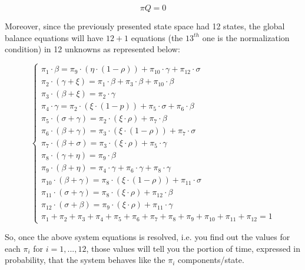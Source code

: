 \documentclass{article}
\begin{document}
\[\pi Q = 0\]

\noindent Moreover, since the previously presented state space had 12 states, the global balance equations will have \(12 + 1\) equations (the \(13^{th}\) one is the normalization condition) in 12 unknowns as represented below:

\begin{equation*}
  \begin{cases}
    \pi_{1} \cdot \beta = \pi_{9} \cdot (\eta \cdot (1 - \rho)) + \pi_{10} \cdot \gamma + \pi_{12} \cdot \sigma \\
    \pi_{2} \cdot (\gamma + \xi) = \pi_{1} \cdot \beta + \pi_{3} \cdot \beta + \pi_{10} \cdot \beta \\
    \pi_{3} \cdot (\beta + \xi) = \pi_{2} \cdot \gamma \\
    \pi_{4} \cdot \gamma = \pi_{2} \cdot (\xi \cdot (1 - p)) + \pi_{5} \cdot \sigma + \pi_{6} \cdot \beta \\
    \pi_{5} \cdot (\sigma + \gamma) = \pi_{2} \cdot (\xi \cdot \rho) + \pi_{7} \cdot \beta \\
    \pi_{6} \cdot (\beta + \gamma) = \pi_{3} \cdot (\xi \cdot (1 - \rho)) +\pi_{7} \cdot \sigma \\
    \pi_{7} \cdot (\beta + \sigma) = \pi_{3} \cdot (\xi \cdot \rho) + \pi_{5} \cdot \gamma \\
    \pi_{8} \cdot (\gamma + \eta) = \pi_{9} \cdot \beta \\
    \pi_{9} \cdot (\beta + \eta) = \pi_{4} \cdot \gamma + \pi_{6} \cdot \gamma + \pi_{8} \cdot \gamma \\
    \pi_{10} \cdot (\beta + \gamma) = \pi_{8} \cdot (\xi \cdot (1 - \rho)) + \pi_{11} \cdot \sigma \\
    \pi_{11} \cdot (\sigma + \gamma) = \pi_{8} \cdot (\xi \cdot \rho) + \pi_{12} \cdot \beta \\
    \pi_{12} \cdot (\sigma + \beta) = \pi_{9} \cdot (\xi \cdot \rho) + \pi_{11} \cdot \gamma \\
    \pi_{1} + \pi_{2} + \pi_{3} + \pi_{4} + \pi_{5} + \pi_{6} + \pi_{7} + \pi_{8} + \pi_{9} + \pi_{10} + \pi_{11} + \pi_{12} = 1
  \end{cases}
\end{equation*}

\noindent So, once the above system equations is resolved, i.e. you find out the values for each \(\pi_{i}\) for \(i=1, ... , 12\), those values will tell you the portion of time, expressed in probability, that the system behaves like the \(\pi_{i}\) components/state.
\end{document}
